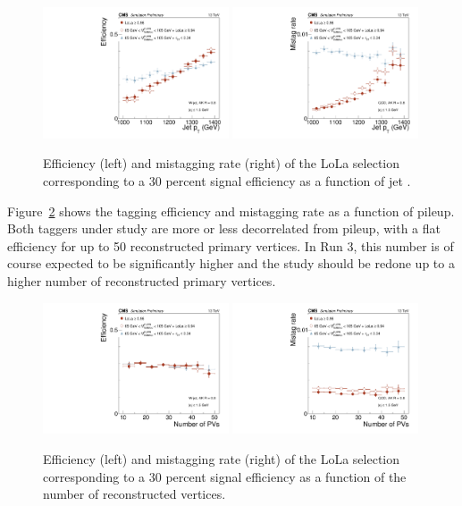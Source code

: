 \begin{figure}[h!]
\centering
\includegraphics[width=0.49\textwidth]{figures/vtagging/AN-18-099/validation/WtagSigEffvsjpt.pdf}
\includegraphics[width=0.49\textwidth]{figures/vtagging/AN-18-099/validation/QCDMistagvsjpt.pdf}
\caption{Efficiency (left) and mistagging rate (right) of the LoLa selection corresponding to a 30 percent signal efficiency as a function of jet \PT.}
\label{fig:lola:eff_val_pt}
\end{figure}
Figure~\ref{fig:lola:eff_val_pu} shows the tagging efficiency and mistagging rate as a function of pileup. Both taggers under study are more or less decorrelated from pileup, with a flat efficiency for up to 50 reconstructed primary vertices. In Run 3, this number is of course expected to be significantly higher and the study should be redone up to a higher number of reconstructed primary vertices.
\begin{figure}[h!]
\centering
\includegraphics[width=0.49\textwidth]{figures/vtagging/AN-18-099/validation/WtagSigEffvsnPV.pdf}
\includegraphics[width=0.49\textwidth]{figures/vtagging/AN-18-099/validation/QCDMistagvsnPV.pdf}
\caption{Efficiency (left) and mistagging rate (right) of the LoLa selection corresponding to a 30 percent signal efficiency as a function of the number of reconstructed vertices.}
\label{fig:lola:eff_val_pu}
\end{figure}
\clearpage
